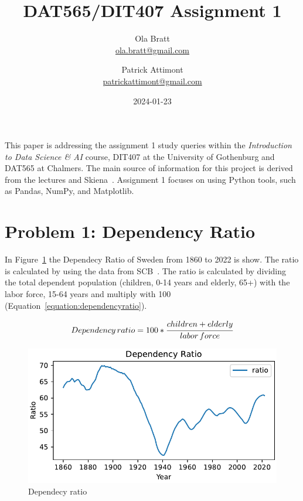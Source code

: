 \documentclass[a4paper]{article}
\begin{document}
\author{Ola Bratt \\
  \href{mailto:ola.bratt@gmail.com}{ola.bratt@gmail.com}
  \and
  Patrick Attimont \\
  \href{patrickattimont@gmail.com}{patrickattimont@gmail.com}
}

\title{DAT565/DIT407 Assignment 1}
\date{2024-01-23}

\maketitle

This paper is addressing the assignment 1 study queries within the \emph{Introduction to Data Science \& AI} course, DIT407 at 
the University of Gothenburg and DAT565 at Chalmers. The main source of information for this project
is derived from the lectures and Skiena~\cite{Skiena:2024}. Assignment 1 focuses on using Python tools, such as Pandas, NumPy, and Matplotlib. 

\section*{Problem 1: Dependency Ratio}

In Figure~\ref{fig:ratio} the Dependecy Ratio of Sweden from 1860 to 2022 is show.
The ratio is calculated by using the data from SCB~\cite{SCB:2023}. The ratio is calculated by dividing 
the total dependent population (children, 0-14 years  and elderly, 65+) with the labor force, 15-64 years and multiply with 100 (Equation~\ref{equation:dependencyratio}).


\begin{equation}
  \label{equation:dependencyratio}
  Dependency \thinspace ratio = 100 * \cfrac{ children + elderly}{labor \thinspace force}
\end{equation}

\begin{figure}[h]
  \begin{center}
    \includegraphics[width=\textwidth]{ratio.pdf}
    \caption{Dependecy ratio}
    \label{fig:ratio}
  \end{center}
\end{figure}
\end{document}
